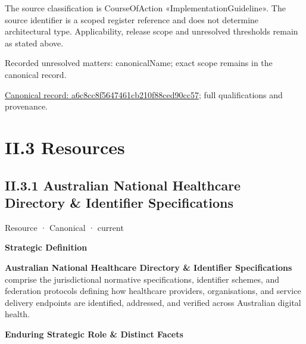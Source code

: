 The source classification is CourseOfAction «ImplementationGuideline». The source identifier is a scoped register reference and does not determine architectural type. Applicability, release scope and unresolved thresholds remain as stated above.


{\small Recorded unresolved matters: canonicalName; exact scope remains in the canonical record.}\par
{\footnotesize \href{../../../../../../../continuum/strategy/course-of-action/implementation-guideline/a6c8cc8f5647461cb210f88ced90cc57.md}{Canonical record: a6c8cc8f5647461cb210f88ced90cc57}; full qualifications and provenance.}\par
\chapter*{II.3 Resources}
\label{navigation:II.3}

\section*{II.3.1 Australian National Healthcare Directory \& Identifier Specifications}
\label{navigation:II.3.1}

\label{element:eac71c56624d43bda2b9d3648f14603a}
{\small Resource · Canonical · current}\par

\par\medskip\textbf{Strategic Definition}\par


\textbf{Australian National Healthcare Directory \& Identifier Specifications} comprise the jurisdictional normative specifications, identifier schemes, and federation protocols defining how healthcare providers, organisations, and service delivery endpoints are identified, addressed, and verified across Australian digital health.



\par\medskip\textbf{Enduring Strategic Role \& Distinct Facets}\par


